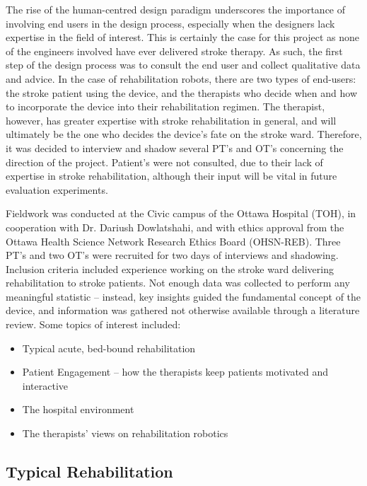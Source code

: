 \documentclass[12pt]{report}
\begin{document}
%
	
	The rise of the human-centred design paradigm underscores the importance of involving end users in the design process, especially when the designers lack expertise in the field of interest. This is certainly the case for this project as none of the engineers involved have ever delivered stroke therapy. As such, the first step of the design process was to consult the end user and collect qualitative data and advice. In the case of rehabilitation robots, there are two types of end-users: the stroke patient using the device, and the therapists who decide when and how to incorporate the device into their rehabilitation regimen. The therapist, however, has greater expertise with stroke rehabilitation in general, and will ultimately be the one who decides the device's fate on the stroke ward. Therefore, it was decided to interview and shadow several PT's and OT's concerning the direction of the project. Patient's were not consulted, due to their lack of expertise in stroke rehabilitation, although their input will be vital in future evaluation experiments. 
	
	Fieldwork was conducted at the Civic campus of the Ottawa Hospital (TOH), in cooperation with Dr. Dariush Dowlatshahi, and with ethics approval from the Ottawa Health Science Network Research Ethics Board (OHSN-REB). Three PT's and two OT's were recruited for two days of interviews and shadowing. Inclusion criteria included experience working on the stroke ward delivering rehabilitation to stroke patients. Not enough data was collected to perform any meaningful statistic -- instead, key insights guided the fundamental concept of the device, and information was gathered not otherwise available through a literature review. Some topics of interest included:
	
	\begin{itemize}
		\item Typical acute, bed-bound rehabilitation 
		\item Patient Engagement -- how the therapists keep patients motivated and interactive
		\item The hospital environment
		\item The therapists' views on rehabilitation robotics 
	\end{itemize}

	
	\subsection{Typical Rehabilitation}
	
\end{document}
